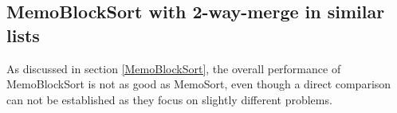 \documentclass[a4paper,12pt]{article}
\begin{document}
\subsection{MemoBlockSort with 2-way-merge in similar lists}\label{MemoBlock2Res}

As discussed in section \ref{MemoBlockSort}, the overall performance of MemoBlockSort is not as good as MemoSort, even though a direct comparison can not be established as they focus on slightly different problems. \\

\begin{figure}[H]
\centering
{}%
\hfill %
%
\\ %
%
\hfill %

\end{figure}
\end{document}
